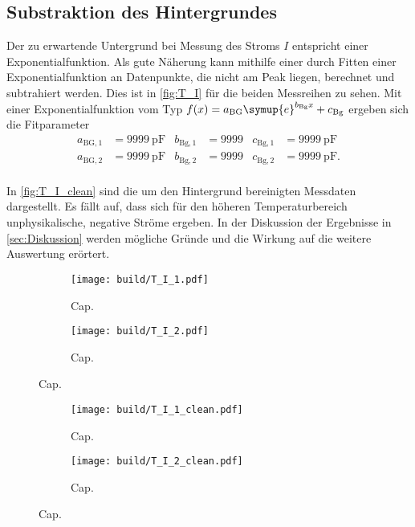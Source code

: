 \subsection{Substraktion des Hintergrundes}
\label{sec:Hintergrund}
Der zu erwartende Untergrund bei Messung des Stroms $I$ entspricht einer Exponentialfunktion. Als gute Näherung kann mithilfe einer durch Fitten einer Exponentialfunktion
an Datenpunkte, die nicht am Peak liegen, berechnet und subtrahiert werden. Dies ist in \autoref{fig:T_I} für die beiden Messreihen zu sehen. Mit einer Exponentialfunktion
vom Typ $f(x) = a_{\text{BG}}\symup{e}^{b_{\text{Bg}}x} + c_{\text{Bg}}$ ergeben sich die Fitparameter
\begin{align*}
    a_{\text{BG}, 1} & = \qty{9999}{\pico\farad} & b_{\text{Bg}, 1} &= \num{9999} & c_{\text{Bg}, 1} &= \qty{9999}{\pico\farad} \\
    a_{\text{BG}, 2} & = \qty{9999}{\pico\farad} & b_{\text{Bg}, 2} &= \num{9999} & c_{\text{Bg}, 2} &= \qty{9999}{\pico\farad}. \\
\end{align*}

In \autoref{fig:T_I_clean} sind die um den Hintergrund bereinigten Messdaten dargestellt. Es fällt auf, dass sich für den höheren Temperaturbereich unphysikalische,
negative Ströme ergeben. In der Diskussion der Ergebnisse in \autoref{sec:Diskussion} werden mögliche Gründe und die Wirkung auf die weitere Auswertung erörtert.

\begin{figure}
    \centering
    \begin{subfigure}{\textwidth}
        \centering
        \texttt{[image: build/T\_I\_1.pdf]}
        \caption{Cap.}
        \label{fig:T_I_1}
    \end{subfigure}
    \begin{subfigure}{\textwidth}
        \centering
        \texttt{[image: build/T\_I\_2.pdf]}
        \caption{Cap.}
        \label{fig:T_I_2}
    \end{subfigure}
    \caption{Cap.}
    \label{fig:T_I}
\end{figure}


\begin{figure}
    \centering
    \begin{subfigure}{\textwidth}
        \centering
        \texttt{[image: build/T\_I\_1\_clean.pdf]}
        \caption{Cap.}
        \label{fig:T_I_1_clean}
    \end{subfigure}
    \begin{subfigure}{\textwidth}
        \centering
        \texttt{[image: build/T\_I\_2\_clean.pdf]}
        \caption{Cap.}
        \label{fig:T_I_2_clean}
    \end{subfigure}
    \caption{Cap.}
    \label{fig:T_I_clean}
\end{figure}

